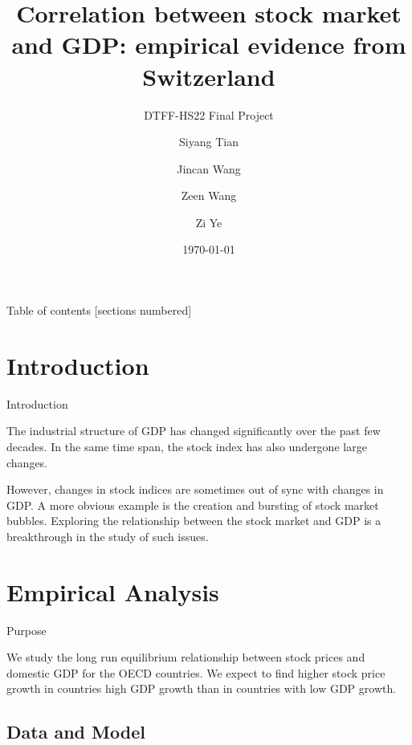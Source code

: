 \documentclass[10pt]{beamer}
\title{Correlation between stock market and GDP:
empirical evidence from Switzerland}
\subtitle{DTFF-HS22 Final Project}
\author{Siyang Tian \and Jincan Wang \and Zeen Wang \and Zi Ye}
\institute{University of Zurich}
\date{\today}
\begin{document}
\maketitle

\begin{frame}{Table of contents}
  [sections numbered]
  \tableofcontents%
\end{frame}

\section[Intro]{Introduction}

\begin{frame}{Introduction}

The industrial structure of GDP has changed significantly over the past few decades. In the same time span, the stock index has also undergone large changes. 

However, changes in stock indices are sometimes out of sync with changes in GDP. A more obvious example is the creation and bursting of stock market bubbles. Exploring the relationship between the stock market and GDP is a breakthrough in the study of such issues.
\end{frame}




\section{Empirical Analysis}

\begin{frame}{Purpose}

We study the long run equilibrium relationship between stock prices and domestic GDP for the OECD countries. We expect to find higher stock price growth in
countries high GDP growth than in countries with low GDP growth.

\end{frame}

\subsection{Data and Model}
\end{document}
